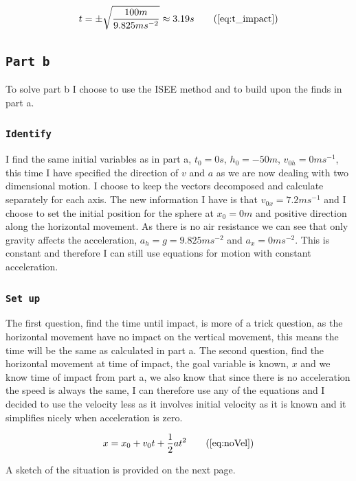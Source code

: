 \documentclass{article}
\let\oldsubsection\subsection
\renewcommand{\subsection}[1]{%
  \oldsubsection{\texttt{#1}}%
  \setcounter{subsubsection}{-1}%
}
\let\oldsubsubsection\subsubsection
\renewcommand{\subsubsection}[1]{%
  \oldsubsubsection{\texttt{#1}}%
}
\begin{document}
\begin{equation*}
    t = \pm \sqrt{\frac{100m}{9.825ms^{-2}}} \approx 3.19s
    \tag{\ref{eq:t_impact}}
\end{equation*}

\clearpage
\subsection{Part b}
To solve part b I choose to use the ISEE method and to build upon the finds in part a.

\subsubsection{Identify}
I find the same initial variables as in part a, \(t_0 = 0s\), \(h_0 = -50m\), \(v_{0h} = 0ms^{-1}\), this time I have specified the direction of \(v\) and \(a\) as we are now dealing with two dimensional motion. I choose to keep the vectors decomposed and calculate separately for each axis. The new information I have is that \(v_{0x} = 7.2ms^{-1}\) and I choose to set the initial position for the sphere at \(x_0 = 0m\) and positive direction along the horizontal movement. As there is no air resistance we can see that only gravity affects the acceleration, \(a_h = g = 9.825ms^{-2}\) and \(a_x = 0ms^{-2}\). This is constant and therefore I can still use equations for motion with constant acceleration.

\subsubsection{Set up}
The first question, find the time until impact, is more of a trick question, as the horizontal movement have no impact on the vertical movement, this means the time will be the same as calculated in part a. The second question, find the horizontal movement at time of impact, the goal variable is known, \(x\) and we know time of impact from part a, we also know that since there is no acceleration the speed is always the same, I can therefore use any of the equations and I decided to use the velocity less as it involves initial velocity as it is known and it simplifies nicely when acceleration is zero.

\begin{equation*}
    x = x_0 + v_0t + \frac{1}{2}at^2
    \tag{\ref{eq:noVel}}
\end{equation*}

A sketch of the situation is provided on the next page.
\clearpage
\end{document}
